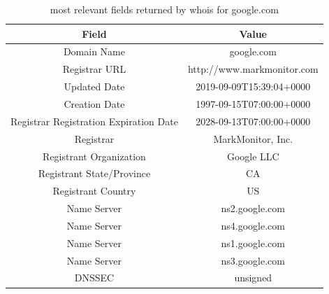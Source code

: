 \documentclass[eng]{class}
\begin{document}
\begin{table}[H]
    \centering
    \tiny
    \begin{tabular}{|c|c|}
        \hline
        \linewidth=0cm
        Field                                  & Value                      \\
        \hline
        Domain Name                            & google.com                 \\
        Registrar URL                          & http://www.markmonitor.com \\
        Updated Date                           & 2019-09-09T15:39:04+0000   \\
        Creation Date                          & 1997-09-15T07:00:00+0000   \\
        Registrar Registration Expiration Date & 2028-09-13T07:00:00+0000   \\
        Registrar                              & MarkMonitor, Inc.          \\
        Registrant Organization                & Google LLC                 \\
        Registrant State/Province              & CA                         \\
        Registrant Country                     & US                         \\
        Name Server                            & ns2.google.com             \\
        Name Server                            & ns4.google.com             \\
        Name Server                            & ns1.google.com             \\
        Name Server                            & ns3.google.com             \\
        DNSSEC                                 & unsigned                   \\
        \hline
    \end{tabular}
    \caption{most relevant fields returned by whois for google.com}
    \label{tab-6}
\end{table}
\end{document}
